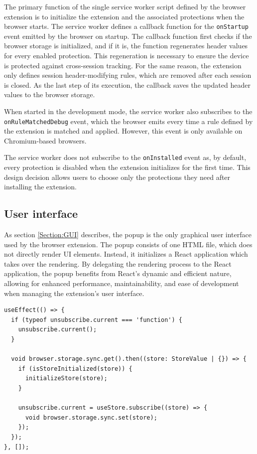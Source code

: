 The primary function of the single service worker script defined by the browser extension is to initialize the extension and the associated protections when the browser starts. The service worker defines a callback function for the \texttt{onStartup} event emitted by the browser on startup. The callback function first checks if the browser storage is initialized, and if it is, the function regenerates header values for every enabled protection. This regeneration is necessary to ensure the device is protected against cross-session tracking. For the same reason, the extension only defines session header-modifying rules, which are removed after each session is closed. As the last step of its execution, the callback saves the updated header values to the browser storage.

When started in the development mode, the service worker also subscribes to the \texttt{onRuleMatchedDebug} event, which the browser emits every time a rule defined by the extension is matched and applied. However, this event is only available on Chromium-based browsers. 

The service worker does not subscribe to the \texttt{onInstalled} event as, by default, every protection is disabled when the extension initializes for the first time. This design decision allows users to choose only the protections they need after installing the extension.

\subsection{User interface}

As section \ref{Section:GUI} describes, the popup is the only graphical user interface used by the browser extension. The popup consists of one HTML file, which does not directly render UI elements. Instead, it initializes a React application which takes over the rendering. By delegating the rendering process to the React application, the popup benefits from React's dynamic and efficient nature, allowing for enhanced performance, maintainability, and ease of development when managing the extension's user interface.

\bigbreak

\begin{lstlisting}[caption={A code snippet in which the React application initializes its storage and creates a subscription for future changes.}]
useEffect(() => {
  if (typeof unsubscribe.current === 'function') {
    unsubscribe.current();
  }

  void browser.storage.sync.get().then((store: StoreValue | {}) => {
    if (isStoreInitialized(store)) {
      initializeStore(store);
    }

    unsubscribe.current = useStore.subscribe((store) => {
      void browser.storage.sync.set(store);
    });
  });
}, []);
\end{lstlisting}

